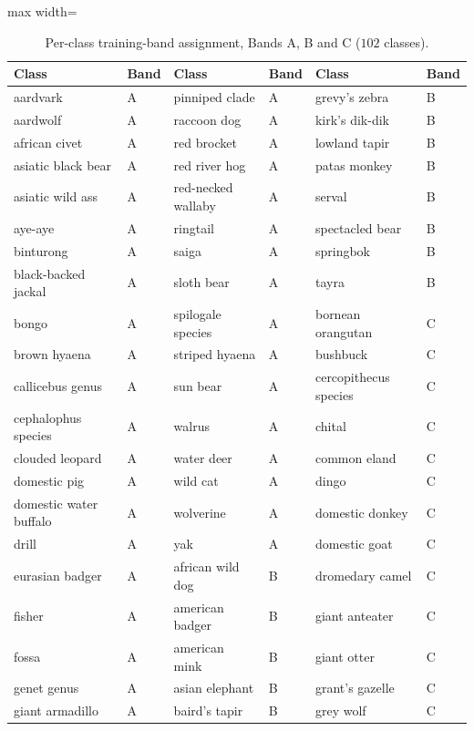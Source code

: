 \begin{table}[p]
\centering
\footnotesize
{}
\caption{Per-class training-band assignment, Bands A, B and C ($102$ classes).}
\label{tab:appendix-class-band-assignment-abc}
\begin{adjustbox}{max width=\textwidth}
\begin{tabular}{@{}llllll@{}}
    \toprule
    Class & Band & Class & Band & Class & Band \\
    \midrule
    aardvark & A & pinniped clade & A & grevy's zebra & B \\
    aardwolf & A & raccoon dog & A & kirk's dik-dik & B \\
    african civet & A & red brocket & A & lowland tapir & B \\
    asiatic black bear & A & red river hog & A & patas monkey & B \\
    asiatic wild ass & A & red-necked wallaby & A & serval & B \\
    aye-aye & A & ringtail & A & spectacled bear & B \\
    binturong & A & saiga & A & springbok & B \\
    black-backed jackal & A & sloth bear & A & tayra & B \\
    bongo & A & spilogale species & A & bornean orangutan & C \\
    brown hyaena & A & striped hyaena & A & bushbuck & C \\
    callicebus genus & A & sun bear & A & cercopithecus species & C \\
    cephalophus species & A & walrus & A & chital & C \\
    clouded leopard & A & water deer & A & common eland & C \\
    domestic pig & A & wild cat & A & dingo & C \\
    domestic water buffalo & A & wolverine & A & domestic donkey & C \\
    drill & A & yak & A & domestic goat & C \\
    eurasian badger & A & african wild dog & B & dromedary camel & C \\
    fisher & A & american badger & B & giant anteater & C \\
    fossa & A & american mink & B & giant otter & C \\
    genet genus & A & asian elephant & B & grant's gazelle & C \\
    giant armadillo & A & baird's tapir & B & grey wolf & C \\

\end{tabular}
\end{adjustbox}
\end{table}
